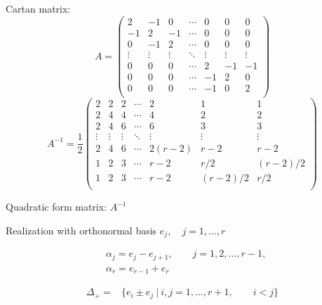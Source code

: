 \documentclass[12pt]{article}
\begin{document}
Cartan matrix:
\[
A=\left(
\begin{array}{ccccccc}
 2 & -1& 0 &\cdots & 0 & 0  &0 \\
 -1& 2 & -1 &\cdots & 0 & 0 &0 \\
 0 & -1 & 2 &\cdots & 0 & 0 &0 \\
  \vdots&\vdots &\vdots &\ddots &\vdots &\vdots&\vdots \\
 0&0 &0 &\cdots & 2& -1 & -1\\
 0&0 &0 &\cdots & -1& 2 &  0 \\
 0&0 &0 &\cdots & -1 & 0 & 2\\
\end{array}
\right)\]
\[
A^{-1}=\frac{1}{2}
\left(
\begin{array}{ccccccc}
 2& 2& 2 &\cdots & 2 & 1 & 1 \\
 2& 4 & 4 &\cdots & 4 & 2 & 2 \\
 2& 4 & 6 &\cdots & 6 & 3 & 3 \\
  \vdots&\vdots &\vdots &\ddots &\vdots &\vdots &\vdots \\
 2&4 &6 &\cdots & 2(r-2)& r-2 & r-2\\
 1&2 &3 &\cdots & r-2  & r/2 & (r-2)/2\\
 1&2 &3 &\cdots & r-2  & (r-2)/2 & r/2\\
\end{array}
\right)
\]

Quadratic form matrix: $A^{-1}$

Realization with orthonormal basis $e_j,\quad j=1,\dots,r$

\begin{align*}
  &\alpha_{j}=e_j-e_{j+1},\qquad j=1,2,\dots,r-1,\\
  &\alpha_{r}=e_{r-1}+e_{r}
\end{align*}

\begin{align*}
 \Delta_{+}=&\{e_i \pm e_j\ |\ i,j=1,\dots,r+1,\qquad i<j\} 
\end{align*}
%
\end{document}
